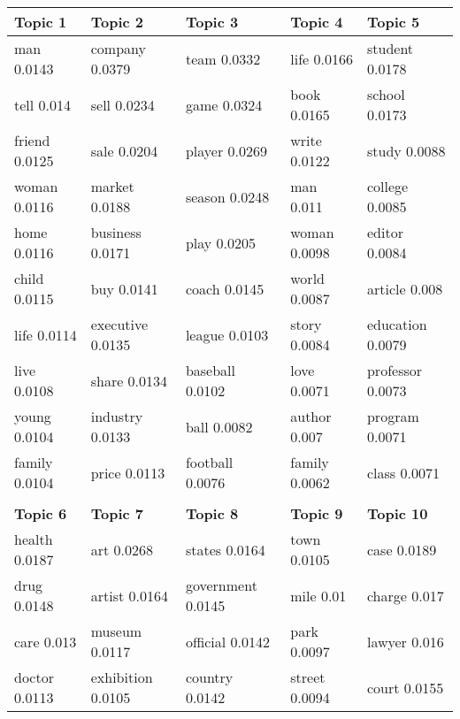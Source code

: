 \documentclass[11pt]{report}
\begin{document}
\begin{table}[!hbt]
\centering
\scriptsize
\begin{tabular}{| l | l | l |l|l|}
\toprule \textbf{Topic 1} & \textbf{Topic 2} & \textbf{Topic 3} & \textbf{Topic 4} & \textbf{Topic 5} \\
                          \midrule man 0.0143 & company 0.0379 & team 0.0332 & life 0.0166 & student 0.0178 \\
                                       tell 0.014 & sell 0.0234 & game 0.0324 & book 0.0165 & school 0.0173 \\
                                  friend 0.0125 & sale 0.0204 & player 0.0269 & write 0.0122 & study 0.0088 \\
                                  woman 0.0116 & market 0.0188 & season 0.0248 & man 0.011 & college 0.0085 \\
                                 home 0.0116 & business 0.0171 & play 0.0205 & woman 0.0098 & editor 0.0084 \\
                                    child 0.0115 & buy 0.0141 & coach 0.0145 & world 0.0087 & article 0.008 \\
                           life 0.0114 & executive 0.0135 & league 0.0103 & story 0.0084 & education 0.0079 \\
                              live 0.0108 & share 0.0134 & baseball 0.0102 & love 0.0071 & professor 0.0073 \\
                               young 0.0104 & industry 0.0133 & ball 0.0082 & author 0.007 & program 0.0071 \\
                              family 0.0104 & price 0.0113 & football 0.0076 & family 0.0062 & class 0.0071 \\
                                                                                                &  &  &  &  \\
     \toprule \textbf{Topic 6} & \textbf{Topic 7} & \textbf{Topic 8} & \textbf{Topic 9} & \textbf{Topic 10} \\
                            \midrule health 0.0187 & art 0.0268 & states 0.0164 & town 0.0105 & case 0.0189 \\
                                 drug 0.0148 & artist 0.0164 & government 0.0145 & mile 0.01 & charge 0.017 \\
                                  care 0.013 & museum 0.0117 & official 0.0142 & park 0.0097 & lawyer 0.016 \\
                          doctor 0.0113 & exhibition 0.0105 & country 0.0142 & street 0.0094 & court 0.0155 \\

\end{tabular}
\end{table}
\end{document}
